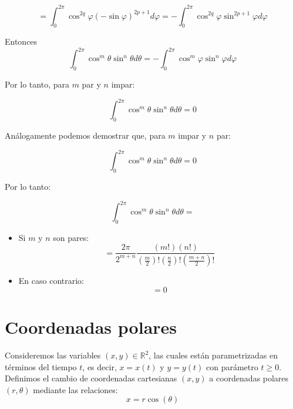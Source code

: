 \[
    =\int_{0}^{2\pi}\cos^{2q}\varphi(-\sin\varphi)^{2p+1} d\varphi=-\int_{0}^{2\pi}\cos^{2q}\varphi\sin^{2p+1}\varphi d\varphi
\]

Entonces 
\[ 
    \int_{0}^{2\pi}\cos^m\theta\sin^n\theta d\theta=-\int_{0}^{2\pi}\cos^{m}\varphi\sin^{n}\varphi d\varphi
\]

Por lo tanto, para $m$ par y $n$ impar:

\begin{equation}\label{eq: integral_cos_sen_general_impar}
    \int_{0}^{2\pi}\cos^m\theta\sin^n\theta d\theta=0
\end{equation}

Análogamente podemos demostrar que, para $m$ impar y $n$ par:

\begin{equation}\label{eq: integral_cos_sen_general_impar_2}
    \int_{0}^{2\pi}\cos^m\theta\sin^n\theta d\theta=0
\end{equation}

Por lo tanto:

\begin{equation}\label{eq: integral_cos_sen_general}
    \int_{0}^{2\pi}\cos^m\theta\sin^n\theta d\theta=
\end{equation}
\begin{itemize}
    \item Si $m$ y $n$ son pares:
    \begin{equation}\label{eq: integral_cos_sen_general_pares}
        =\frac{2\pi}{2^{m+n}}\frac{(m!)(n!)}{(\frac{m}{2})!(\frac{n}{2})!(\frac{m+n}{2})!}
    \end{equation}
    \item En caso contrario:
    \begin{equation}\label{eq: integral_cos_sen_general_impar}
        =0
    \end{equation}
\end{itemize}


\section{Coordenadas polares}

Consideremos las variables $(x,y)\in\mathbb{R}^2$, las cuales están parametrizadas en términos del tiempo $t$, es decir, $x=x(t)$ y $y=y(t)$ con parámetro $t\geq0$. Definimos el cambio de coordenadas cartesianas $(x,y)$
a coordenadas polares $(r,\theta)$ mediante las relaciones:
\begin{equation}\label{eq: xpolar}
	x=r\cos(\theta)
\end{equation}

